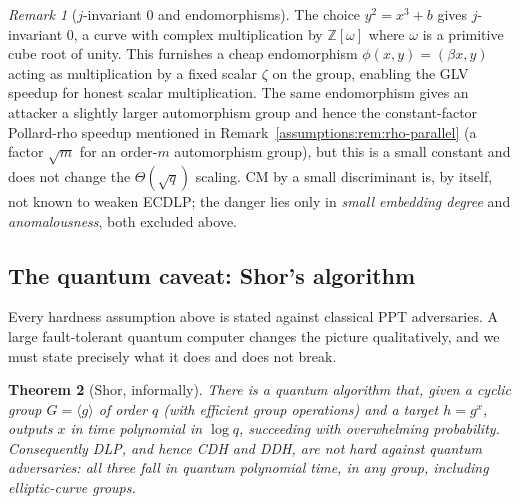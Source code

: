 \documentclass[11pt,a4paper]{article}
\newtheorem{theorem}{Theorem}[section]
\theoremstyle{definition}
\theoremstyle{remark}
\newtheorem{remark}[theorem]{Remark}
\newcommand{\Z}{\ensuremath{\mathbb{Z}}}
\begin{document}
\begin{remark}[\(j\)-invariant \(0\) and endomorphisms]
\label{assumptions:rem:j0}
The choice \(y^2 = x^3 + b\) gives \(j\)-invariant \(0\), a curve with complex multiplication by \(\Z[\omega]\) where \(\omega\) is a primitive cube root of unity. This furnishes a cheap endomorphism \(\phi(x,y) = (\beta x, y)\) acting as multiplication by a fixed scalar \(\zeta\) on the group, enabling the GLV speedup for honest scalar multiplication. The same endomorphism gives an attacker a slightly larger automorphism group and hence the constant-factor Pollard-rho speedup mentioned in Remark~\ref{assumptions:rem:rho-parallel} (a factor \(\sqrt{m}\) for an order-\(m\) automorphism group), but this is a small constant and does not change the \(\Theta(\sqrt q)\) scaling. CM by a small discriminant is, by itself, not known to weaken ECDLP; the danger lies only in \emph{small embedding degree} and \emph{anomalousness}, both excluded above.
\end{remark}

\subsection{The quantum caveat: Shor's algorithm}
\label{assumptions:subsec:quantum}

Every hardness assumption above is stated against classical PPT adversaries. A large fault-tolerant quantum computer changes the picture qualitatively, and we must state precisely what it does and does not break.

\begin{theorem}[Shor, informally]
\label{assumptions:thm:shor}
There is a quantum algorithm that, given a cyclic group \(G = \langle g\rangle\) of order \(q\) (with efficient group operations) and a target \(h = g^{x}\), outputs \(x\) in time polynomial in \(\log q\), succeeding with overwhelming probability. Consequently DLP, and hence CDH and DDH, are \emph{not} hard against quantum adversaries: all three fall in quantum polynomial time, in \emph{any} group, including elliptic-curve groups.
\end{theorem}
\end{document}
